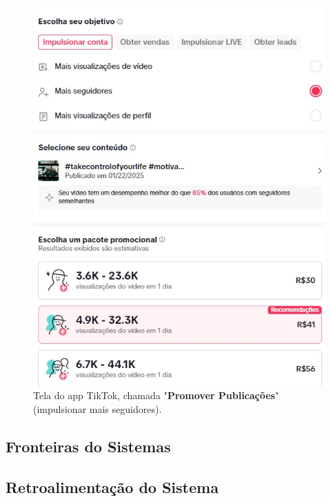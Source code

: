 \begin{figure}[H]
    \begin{minipage}{0.45\textwidth}
        \centering
        \includegraphics[width=\linewidth]{Relatório/Figuras/promover_publicação2.jpg}
        \caption{Tela do app TikTok, chamada "\textbf{Promover Publicações}" (impulsionar mais seguidores).}
        \label{fig:promover_publicacao2}
    \end{minipage}
\end{figure}










\newpage
\subsection{Fronteiras do Sistemas}





\subsection{Retroalimentação do Sistema}

